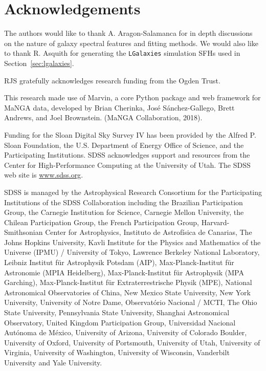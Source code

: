 \documentclass[useAMS,usenatbib]{mn2e}
\begin{document}
\section*{Acknowledgements}

The authors would like to thank A. Aragon-Salamanca for in depth discussions on the nature of galaxy spectral features and fitting methods. We would also like to thank R. Asquith for generating the \texttt{LGalaxies} simulation SFHs used in Section~\ref{sec:lgalaxies}.

RJS gratefully acknowledges research funding from the Ogden Trust. 

This research made use of Marvin, a core Python package and web framework for MaNGA data, developed by Brian Cherinka, Jos\'e S\'anchez-Gallego, Brett Andrews, and Joel Brownstein. (MaNGA Collaboration, 2018).

Funding for the Sloan Digital Sky Survey IV has been provided by the Alfred P. Sloan Foundation, the U.S. Department of Energy Office of Science, and the Participating Institutions. SDSS acknowledges support and resources from the Center for High-Performance Computing at the University of Utah. The SDSS web site is \url{www.sdss.org}.

SDSS is managed by the Astrophysical Research Consortium for the Participating Institutions of the SDSS Collaboration including the Brazilian Participation Group, the Carnegie Institution for Science, Carnegie Mellon University, the Chilean Participation Group, the French Participation Group, Harvard-Smithsonian Center for Astrophysics, Instituto de Astrof\'isica de Canarias, The Johns Hopkins University, Kavli Institute for the Physics and Mathematics of the Universe (IPMU) / University of Tokyo, Lawrence Berkeley National Laboratory, Leibniz Institut für Astrophysik Potsdam (AIP), Max-Planck-Institut f\"ur Astronomie (MPIA Heidelberg), Max-Planck-Institut für Astrophysik (MPA Garching), Max-Planck-Institut f\"ur Extraterrestrische Physik (MPE), National Astronomical Observatories of China, New Mexico State University, New York University, University of Notre Dame, Observat\'orio Nacional / MCTI, The Ohio State University, Pennsylvania State University, Shanghai Astronomical Observatory, United Kingdom Participation Group, Universidad Nacional Aut\'onoma de M\'exico, University of Arizona, University of Colorado Boulder, University of Oxford, University of Portsmouth, University of Utah, University of Virginia, University of Washington, University of Wisconsin, Vanderbilt University and Yale University.



  
\end{document}
